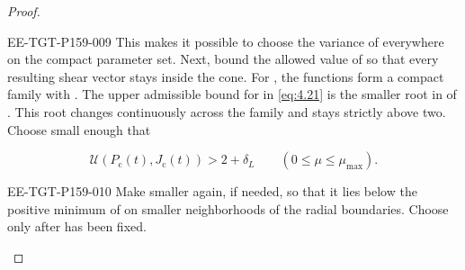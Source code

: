 \begin{proof}
\begin{EESegment}{EE-TGT-P159-009}
This makes it possible to choose the variance of  everywhere on the compact parameter set. Next, bound the allowed value of  so that every resulting shear vector stays inside the cone.
For , the functions
 form a compact family with
. The upper
admissible bound  for  in \eqref{eq:4.21} is the smaller root in
 of
. This root changes continuously across the family and stays strictly above two. Choose  small enough that
\end{EESegment}
\begin{equation}
 \mathcal U(P_{\mathrm c}(t),J_{\mathrm c}(t))>2+\delta_L
 \qquad(0\leq\mu\leq\mu_{\max}).
\tag{C.8}\label{eq:C.8}
\end{equation}
\begin{EESegment}{EE-TGT-P159-010}
Make  smaller again, if needed, so that it lies below the positive minimum of  on smaller neighborhoods of the
radial boundaries. Choose  only after  has been fixed.
\end{EESegment}


\end{proof}
